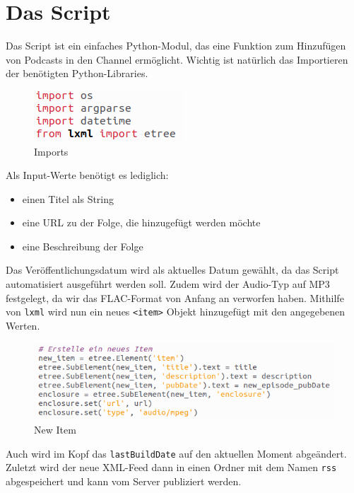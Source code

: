 \documentclass[a4paper,12pt]{article}
\begin{document}
\section{Das Script}
Das Script ist ein einfaches Python-Modul, das eine Funktion zum Hinzufügen von Podcasts in den Channel ermöglicht. Wichtig ist natürlich das Importieren der benötigten Python-Libraries.
\begin{figure}[H]
    \centering
    \includegraphics[width=0.25\linewidth]{Pics/RssImports.png}
    \caption{Imports}
    \label{fig:enter-label}
\end{figure}
Als Input-Werte benötigt es lediglich:
\begin{itemize}
    \item einen Titel als String
    \item eine URL zu der Folge, die hinzugefügt werden möchte
    \item eine Beschreibung der Folge
\end{itemize}
Das Veröffentlichungsdatum wird als aktuelles Datum gewählt, da das Script automatisiert ausgeführt werden soll. Zudem wird der Audio-Typ auf MP3 festgelegt, da wir das FLAC-Format von Anfang an verworfen haben. Mithilfe von \texttt{lxml} wird nun ein neues \texttt{<item>} Objekt hinzugefügt mit den angegebenen Werten.
\begin{figure}[H]
    \centering
    \includegraphics[width=0.75\linewidth]{Pics/RSSitem.png}
    \caption{New Item}
    \label{fig:enter-label}
\end{figure}
Auch wird im Kopf das \texttt{lastBuildDate} auf den aktuellen Moment abgeändert. Zuletzt wird der neue XML-Feed dann in einen Ordner mit dem Namen \texttt{rss} abgespeichert und kann vom Server publiziert werden.
\end{document}
